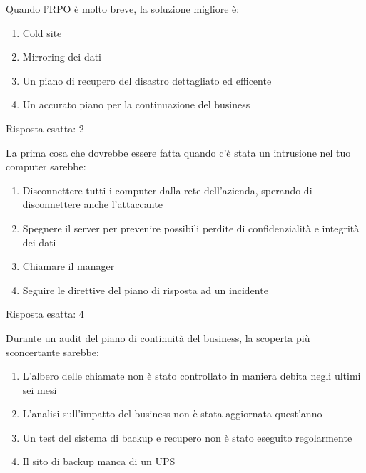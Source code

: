 \begin{Exercise} [
  title={RTO Stretto},
  label={bcdr3}
 ]

 \Question Quando l'RPO è molto breve, la soluzione migliore è:
 \begin{enumerate}
  \item Cold site
  \item Mirroring dei dati
  \item Un piano di recupero del disastro dettagliato ed efficente
  \item Un accurato piano per la continuazione del business
 \end{enumerate}

\end{Exercise}

\begin{Answer} [
  ref={bcdr3},
  number={3}
 ]

 \Question Risposta esatta: 2
\end{Answer}

\label{EsBCDR2}

\begin{Exercise} [
  title={Azioni da intraprendere},
  label={bcdr4}
 ]

 \Question La prima cosa che dovrebbe essere fatta quando c'è stata un
 intrusione nel tuo computer sarebbe:
 \begin{enumerate}
   \item Disconnettere tutti i computer dalla rete dell'azienda, sperando di
   disconnettere anche l'attaccante
   \item Spegnere il server per prevenire possibili perdite di confidenzialità
   e integrità dei dati
   \item Chiamare il manager
   \item Seguire le direttive del piano di risposta ad un incidente
 \end{enumerate}

\end{Exercise}

\begin{Answer} [
  ref={bcdr4},
  number={4}
 ]

 \Question Risposta esatta: 4
\end{Answer}


\begin{Exercise} [
  title={Domanda su BCP},
  label={bcdr5}
 ]

 \Question Durante un audit del piano di continuità del business, la scoperta
 più sconcertante sarebbe:
 \begin{enumerate}
   \item L'albero delle chiamate non è stato controllato in maniera debita
   negli ultimi sei mesi
   \item L'analisi sull'impatto del business non è stata aggiornata quest'anno
   \item Un test del sistema di backup e recupero non è stato eseguito
   regolarmente
   \item Il sito di backup manca di un UPS
 \end{enumerate}

\end{Exercise}


